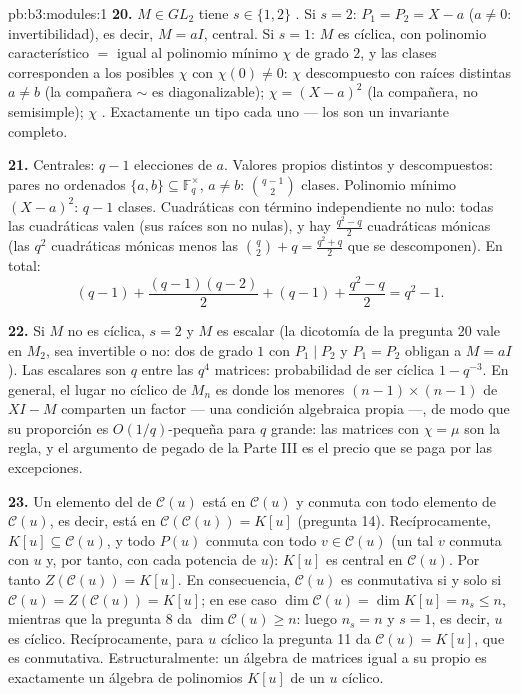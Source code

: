 \begin{solution}{pb:b3:modules:1}
\textbf{20.} $M \in GL_2$ tiene $s \in \{1, 2\}$
. Si $s = 2$:
$P_1 = P_2 = X - a$ ($a \neq 0$: invertibilidad), es decir, $M = aI$,
central. Si $s = 1$: $M$ es cíclica, con polinomio característico $=$
igual al polinomio mínimo $\chi$ de grado $2$, y las clases corresponden
a los posibles $\chi$ con $\chi(0) \neq 0$: $\chi$ descompuesto con
raíces distintas $a \neq
b$ (la compañera $\sim$ es diagonalizable); $\chi = (X - a)^2$ (la
compañera, no semisimple); $\chi$
. Exactamente un tipo
cada uno --- los  son
un invariante completo.

\textbf{21.} Centrales: $q - 1$ elecciones de $a$. Valores propios
distintos y descompuestos: pares no ordenados $\{a, b\} \subseteq
\mathbb F_q^\times$, $a \neq b$: $\binom{q-1}2$ clases. Polinomio mínimo
$(X-a)^2$: $q - 1$ clases. Cuadráticas
 con término
independiente no nulo: todas las cuadráticas
 valen (sus raíces son
no nulas), y hay $\frac{q^2 - q}2$ cuadráticas mónicas
 (las $q^2$ cuadráticas
mónicas menos las $\binom q2 + q = \frac{q^2+q}2$ que se descomponen).
En total:
\[
(q - 1) + \frac{(q-1)(q-2)}2 + (q - 1) + \frac{q^2 - q}2
= q^2 - 1 .
\]

\textbf{22.} Si $M$ no es cíclica, $s = 2$ y $M$ es escalar (la
dicotomía de la pregunta 20 vale en $M_2$, sea invertible o no: dos
 de grado $1$ con
$P_1 \mid P_2$ y $P_1 =
P_2$ obligan a $M = aI$). Las escalares son $q$ entre las $q^4$
matrices: probabilidad de ser cíclica $1 - q^{-3}$. En general, el lugar
no cíclico de $M_n$ es donde los menores $(n-1)\times(n-1)$ de $XI - M$
comparten un factor --- una condición algebraica propia ---, de modo que
su proporción es $O(1/q)$-pequeña para $q$ grande: las matrices con
$\chi = \mu$ son la regla, y el argumento de pegado de la Parte III es
el precio que se paga por las excepciones.

\textbf{23.} Un elemento del  de
$\mathcal C(u)$ está en $\mathcal C(u)$ y conmuta con todo elemento de
$\mathcal C(u)$, es decir, está en $\mathcal C(\mathcal C(u)) =
K[u]$ (pregunta 14). Recíprocamente, $K[u] \subseteq \mathcal C(u)$, y
todo $P(u)$ conmuta con todo $v \in \mathcal C(u)$ (un tal $v$ conmuta
con $u$ y, por tanto, con cada potencia de $u$): $K[u]$ es central en
$\mathcal C(u)$. Por tanto $Z(\mathcal C(u))
= K[u]$. En consecuencia, $\mathcal C(u)$ es conmutativa si y solo si
$\mathcal C(u) = Z(\mathcal C(u)) = K[u]$; en ese caso
$\dim\mathcal C(u) = \dim K[u] = n_s \leq n$, mientras que la pregunta 8
da $\dim\mathcal C(u) \geq n$: luego $n_s = n$ y $s = 1$, es decir, $u$
es cíclico. Recíprocamente, para $u$ cíclico la pregunta 11 da
$\mathcal C(u) = K[u]$, que es conmutativa. Estructuralmente: un álgebra
de matrices igual a su propio  es
exactamente un álgebra de polinomios $K[u]$ de un $u$ cíclico.


\end{solution}
